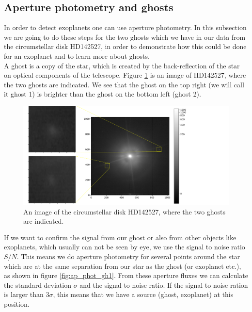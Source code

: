 \subsection{Aperture photometry and ghosts}
In order to detect exoplanets one can use aperture photometry. In this subsection we are going to do these steps for the two ghosts which we have in our data from the circumstellar disk HD142527, in order to demonstrate how this could be done for an exoplanet and to learn more about ghosts.\\
A ghost is a copy of the star, which is created by the back-reflection of the star on optical components of the telescope. Figure \ref{fig:ghosts} is an image of HD142527, where the two ghosts are indicated. We see that the ghost on the top right (we will call it ghost 1) is brighter than the ghost on the bottom left (ghost 2). 
\begin{figure}[H]
	\centering
		\includegraphics[width=1.3\textwidth]{pics/Ghosts.pdf}
		\caption{An image of the circumstellar disk HD142527, where the two ghosts are indicated.}
		\label{fig:ghosts}
\end{figure}
If we want to confirm the signal from our ghost or also from other objects like exoplanets, which usually can not be seen by eye, we use the signal to noise ratio $S/N$. This means we do aperture photometry for several points around the star which are at the same separation from our star as the ghost (or exoplanet etc.), as shown in figure \ref{fig:ap_phot_gh1}. From these aperture fluxes we can calculate the standard deviation $\sigma$ and the signal to noise ratio. If the signal to noise ration is larger than $3 \sigma$, this means that we have a source (ghost, exoplanet) at this position. 
